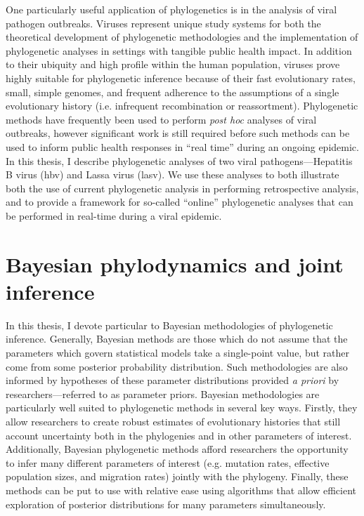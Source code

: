 One particularly useful application of phylogenetics is in the analysis of viral pathogen outbreaks.
Viruses represent unique study systems for both the theoretical development of phylogenetic methodologies and the implementation of phylogenetic analyses in settings with tangible public health impact.
In addition to their ubiquity and high profile within the human population, viruses prove highly suitable for phylogenetic inference because of their fast evolutionary rates, small, simple genomes, and frequent adherence to the assumptions of a single evolutionary history (i.e. infrequent recombination or reassortment).
Phylogenetic methods have frequently been used to perform \textit{post hoc} analyses of viral outbreaks, however significant work is still required before such methods can be used to inform public health responses in ``real time'' during an ongoing epidemic.
In this thesis, I describe phylogenetic analyses of two viral pathogens---Hepatitis B virus (\gls{hbv}) and Lassa virus (\gls{lasv}).
We use these analyses to both illustrate both the use of current phylogenetic analysis in performing retrospective analysis, and to provide a framework for so-called ``online'' phylogenetic analyses that can be performed in real-time during a viral epidemic.

\section{Bayesian phylodynamics and joint inference}

In this thesis, I devote particular to Bayesian methodologies of phylogenetic inference.
Generally, Bayesian methods are those which do not assume that the parameters which govern statistical models take a single-point value, but rather come from some posterior probability distribution.
Such methodologies are also informed by hypotheses of these parameter distributions provided \textit{a priori} by researchers---referred to as parameter priors.
Bayesian methodologies are particularly well suited to phylogenetic methods in several key ways.
Firstly, they allow researchers to create robust estimates of evolutionary histories that still account uncertainty both in the phylogenies and in other parameters of interest.
Additionally, Bayesian phylogenetic methods afford researchers the opportunity to infer many different parameters of interest (e.g. mutation rates, effective population sizes, and migration rates) jointly with the phylogeny.
Finally, these methods can be put to use with relative ease using algorithms that allow efficient exploration of posterior distributions for many parameters simultaneously.

